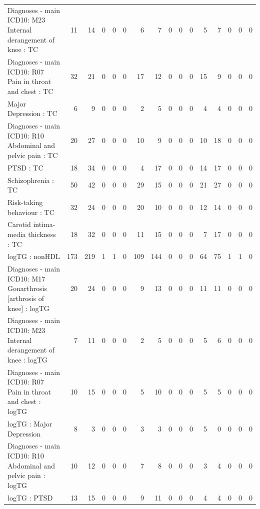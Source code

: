 \begin{table}[ht]
\begin{tabular}{lrrrrrrrrrrrrrrr}
  Diagnoses - main ICD10: M23 Internal derangement of knee : TC &  11 &  14 &   0 &   0 &   0 &   6 &   7 &   0 &   0 &   0 &   5 &   7 &   0 &   0 &   0 \\ 
  Diagnoses - main ICD10: R07 Pain in throat and chest : TC &  32 &  21 &   0 &   0 &   0 &  17 &  12 &   0 &   0 &   0 &  15 &   9 &   0 &   0 &   0 \\ 
  Major Depression : TC &   6 &   9 &   0 &   0 &   0 &   2 &   5 &   0 &   0 &   0 &   4 &   4 &   0 &   0 &   0 \\ 
  Diagnoses - main ICD10: R10 Abdominal and pelvic pain : TC &  20 &  27 &   0 &   0 &   0 &  10 &   9 &   0 &   0 &   0 &  10 &  18 &   0 &   0 &   0 \\ 
  PTSD : TC &  18 &  34 &   0 &   0 &   0 &   4 &  17 &   0 &   0 &   0 &  14 &  17 &   0 &   0 &   0 \\ 
  Schizophrenia : TC &  50 &  42 &   0 &   0 &   0 &  29 &  15 &   0 &   0 &   0 &  21 &  27 &   0 &   0 &   0 \\ 
  Risk-taking behaviour : TC &  32 &  24 &   0 &   0 &   0 &  20 &  10 &   0 &   0 &   0 &  12 &  14 &   0 &   0 &   0 \\ 
  Carotid intima-media thickness : TC &  18 &  32 &   0 &   0 &   0 &  11 &  15 &   0 &   0 &   0 &   7 &  17 &   0 &   0 &   0 \\ 
  logTG : nonHDL & 173 & 219 &   1 &   1 &   0 & 109 & 144 &   0 &   0 &   0 &  64 &  75 &   1 &   1 &   0 \\ 
  Diagnoses - main ICD10: M17 Gonarthrosis [arthrosis of knee] : logTG &  20 &  24 &   0 &   0 &   0 &   9 &  13 &   0 &   0 &   0 &  11 &  11 &   0 &   0 &   0 \\ 
  Diagnoses - main ICD10: M23 Internal derangement of knee : logTG &   7 &  11 &   0 &   0 &   0 &   2 &   5 &   0 &   0 &   0 &   5 &   6 &   0 &   0 &   0 \\ 
  Diagnoses - main ICD10: R07 Pain in throat and chest : logTG &  10 &  15 &   0 &   0 &   0 &   5 &  10 &   0 &   0 &   0 &   5 &   5 &   0 &   0 &   0 \\ 
  logTG : Major Depression &   8 &   3 &   0 &   0 &   0 &   3 &   3 &   0 &   0 &   0 &   5 &   0 &   0 &   0 &   0 \\ 
  Diagnoses - main ICD10: R10 Abdominal and pelvic pain : logTG &  10 &  12 &   0 &   0 &   0 &   7 &   8 &   0 &   0 &   0 &   3 &   4 &   0 &   0 &   0 \\ 
  logTG : PTSD &  13 &  15 &   0 &   0 &   0 &   9 &  11 &   0 &   0 &   0 &   4 &   4 &   0 &   0 &   0 \\ 

\end{tabular}
\end{table}
